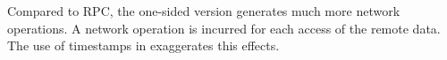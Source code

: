 Compared to RPC, 
the one-sided version
generates much more network operations. 
A network operation is incurred for each 
access of the remote data.
The use of timestamps in \mvcc exaggerates this effects. 




